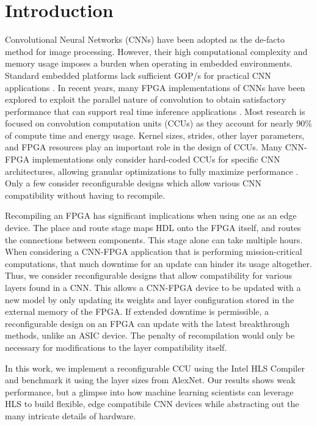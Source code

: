 \chapter {Introduction}
 
Convolutional Neural Networks (CNNs) have been adopted as the de-facto method for image processing. However, their high computational complexity and memory usage imposes a burden when operating in embedded environments. Standard embedded platforms lack sufficient GOP/s for practical CNN applications \cite{guo2018angel}. In recent years, many FPGA implementations of CNNs have been explored to exploit the parallel nature of convolution to obtain satisfactory performance that can support real time inference applications \cite{toledo2012fpga}. Most research is focused on convolution computation units (CCUs) as they account for nearly 90\% of compute time and energy usage. Kernel sizes, strides, other layer parameters, and FPGA resources play an important role in the design of CCUs. Many CNN-FPGA implementations only consider hard-coded CCUs for specific CNN architectures, allowing granular optimizations to fully maximize performance \cite{liu2016automatic, toledo2012fpga, hwang2017efficient, bettoni2017convolutional, jiao2017accelerating}. Only a few consider reconfigurable designs which allow various CNN compatibility without having to recompile\cite{tu2017deep, dicecco2016caffeinated, lu2017evaluating}.

Recompiling an FPGA has significant implications when using one as an edge device. The place and route stage maps HDL onto the FPGA itself, and routes the connections between components. This stage alone can take multiple hours. When considering a CNN-FPGA application that is performing mission-critical computations, that much downtime for an update can hinder its usage altogether. Thus, we consider reconfigurable designs that allow compatibility for various layers found in a CNN. This allows a CNN-FPGA device to be updated with a new model by only updating its weights and layer configuration stored in the external memory of the FPGA. If extended downtime is permissible, a reconfigurable design on an FPGA can update with the latest breakthrough methods, unlike an ASIC device. The penalty of recompilation would only be necessary for modifications to the layer compatibility itself.

In this work, we implement a reconfigurable CCU using the Intel HLS Compiler and benchmark it using the layer sizes from AlexNet. Our results shows weak performance, but a glimpse into how machine learning scientists can leverage HLS to build flexible, edge compatibile CNN devices while abstracting out the many intricate details of hardware.

